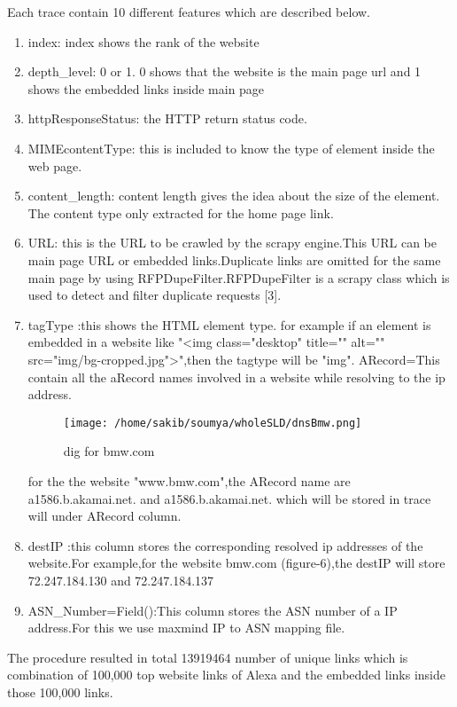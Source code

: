 Each trace contain 10 different features which are described below.
\begin{enumerate}
   \item index: index shows the rank of the website
	\item depth\_level: 0 or 1.
			  0 shows that the website is the main page url and 1 shows the embedded links inside main page 
\item httpResponseStatus: the HTTP return status code.
\item MIMEcontentType: this is included to know the type of element inside the web page.
\item content\_length: content length gives the idea about the size of the element. The content type only extracted for the home page link.
\item URL: this is the URL to be crawled by the scrapy engine.This URL can be main page URL or embedded links.Duplicate links are omitted for the same main page by using RFPDupeFilter.RFPDupeFilter is a scrapy class which is used to detect and filter duplicate requests [3].
\item tagType :this shows the HTML element type.
		for example if an element is embedded in a website like "<img class="desktop" title="" alt="" src="img/bg-cropped.jpg">",then the tagtype will be "img". 
ARecord=This contain all the aRecord names involved in a website while resolving to the ip address.
\begin{figure}[h]
\texttt{[image: /home/sakib/soumya/wholeSLD/dnsBmw.png]}
\centering
\caption{dig for bmw.com}
\end{figure}
for the the website "www.bmw.com",the ARecord name are a1586.b.akamai.net. and a1586.b.akamai.net. which will be stored in trace will under ARecord column.
\item destIP :this column stores the corresponding resolved ip addresses of the website.For example,for the website bmw.com (figure-6),the destIP will store 72.247.184.130 and 72.247.184.137
\item ASN\_Number=Field():This column stores the ASN number of a IP address.For this we use maxmind IP to ASN mapping file.
    \end{enumerate}
    
The procedure resulted in total 13919464 number of unique links which is combination of 100,000 top website links of Alexa and the embedded links inside those 100,000 links.


